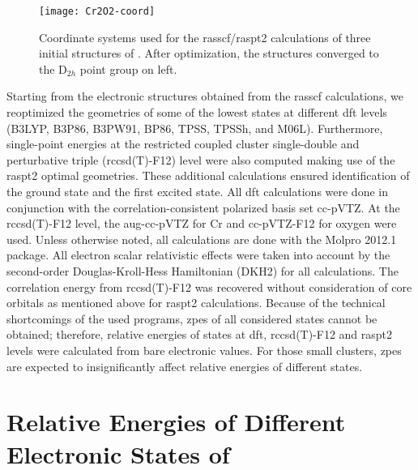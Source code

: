 \begin{refsection}
\begin{figure}[htbp!]
    \centering
	\texttt{[image: Cr2O2-coord]}
	\caption{Coordinate systems used for the \acrshort{rasscf}/\acrshort{raspt2} calculations of three initial structures of . After optimization, the structures converged to the D$_{2h}$ point group on left.}
	\label{a7fig:Cr2O2-coord}
\end{figure}

Starting from the electronic structures obtained from the \acrshort{rasscf} calculations, we reoptimized the geometries of some of the lowest states at different \acrshort{dft} levels (B3LYP,\cite{lyp, b3lyp2, b3} B3P86,\cite{b3,p86} B3PW91,\cite{b3} BP86,\cite{b3lyp2, p86} TPSS,\cite{tpss} TPSSh, and M06L\cite{m06l}). Furthermore, single-point energies at the restricted coupled cluster single-double and perturbative triple (\acrshort{rccsd}(T)-F12) level were also computed making use of the \acrshort{raspt2} optimal geometries. These additional calculations ensured identification of the ground state and the first excited state. All \acrshort{dft} calculations were done in conjunction with the correlation-consistent polarized basis set cc-pVTZ.\cite{basis-augM,basis-ccO} At the \acrshort{rccsd}(T)-F12 level,\cite{f12.1,f12.2} the aug-cc-pVTZ\cite{basis-augM} for Cr and cc-pVTZ-F12\cite{basis-F12} for oxygen were used. Unless otherwise noted, all calculations are done with the Molpro 2012.1 package.\cite{molpro2012} All electron scalar relativistic effects were taken into account by the second-order Douglas-Kroll-Hess Hamiltonian (DKH2)\cite{DKH} for all  calculations. The correlation energy from \acrshort{rccsd}(T)-F12 was recovered without consideration of core orbitals as mentioned above for \acrshort{raspt2} calculations. Because of the technical shortcomings of the used programs, \acrshort{zpe}s of all considered states cannot be obtained; therefore, relative energies of  states at \acrshort{dft}, \acrshort{rccsd}(T)-F12 and \acrshort{raspt2} levels were calculated from bare electronic values. For those small clusters, \acrshort{zpe}s are expected to insignificantly affect relative energies of different states.\cite{ZPE}

\newpage

\section[Relative Energies]{Relative Energies of Different Electronic States of }


\end{refsection}

